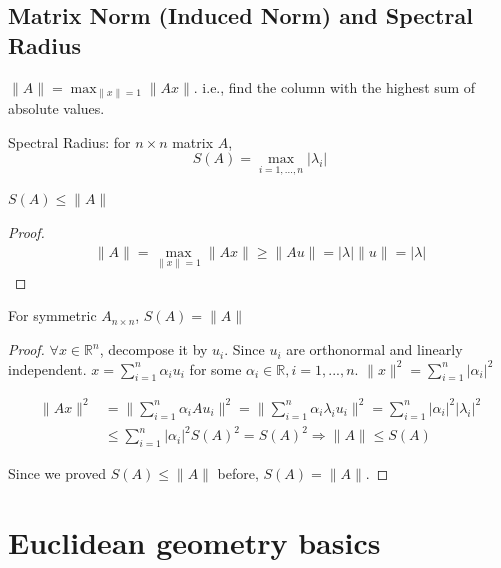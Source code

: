 \documentclass[11pt]{elegantbook}
\begin{document}
\section{Matrix Norm (Induced Norm) and Spectral Radius}
$\|A\|=\max _{\|x\|=1}\|A x\|$. i.e., find the column with the highest sum of absolute values.

Spectral Radius: for $n\times n$ matrix $A$, $$S(A)=\max_{i=1,...,n}|\lambda_i|$$

\begin{proposition}
$S(A)\leq \|A\|$
\end{proposition}
\begin{proof}
\begin{equation}
    \begin{aligned}
        \|A\|=\max _{\|x\|=1}\|A x\|\geq \|Au\|=|\lambda|\|u\|=|\lambda|
    \end{aligned}
    \nonumber
\end{equation}
\end{proof}

\begin{proposition}
    For symmetric $A_{n\times n}$, $S(A)= \|A\|$
\end{proposition}
\begin{proof}
\quad

$\forall x\in \mathbb{R}^n$, decompose it by $u_i$.
Since $u_i$ are orthonormal and linearly independent. $x=\sum_{i=1}^n\alpha_i u_i$ for some $\alpha_i\in \mathbb{R},i=1,...,n$. $\|x\|^2=\sum_{i=1}^n|\alpha_i|^2$

\begin{equation}
    \begin{aligned}
        \|Ax\|^2&=\|\sum_{i=1}^n\alpha_i A u_i\|^2=\|\sum_{i=1}^n\alpha_i \lambda_i u_i\|^2=\sum_{i=1}^n|\alpha_i|^2|\lambda_i|^2\\
        &\leq \sum_{i=1}^n|\alpha_i|^2S(A)^2=S(A)^2 \Rightarrow	\|A\|\leq S(A)
    \end{aligned}
    \nonumber
\end{equation}

Since we proved $S(A)\leq \|A\|$ before, $S(A)=\|A\|$.
\end{proof}









\chapter{Euclidean geometry basics}
\end{document}
